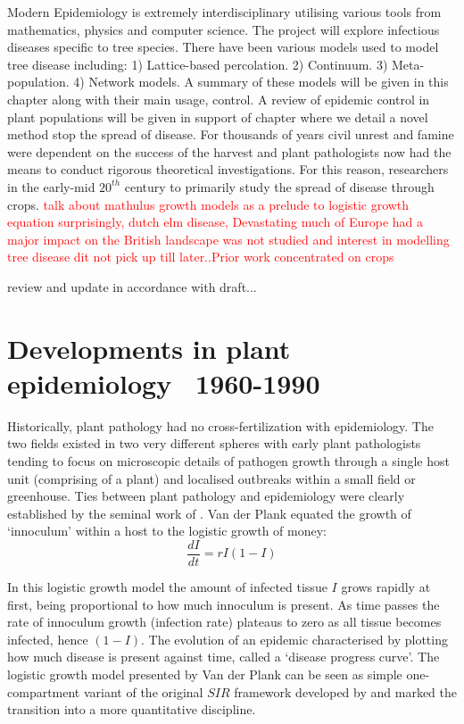 Modern Epidemiology is extremely interdisciplinary utilising various tools from mathematics, physics and computer science. The project will explore infectious diseases specific to tree species. There have been various models used to model tree disease including: 1) Lattice-based percolation. 2) Continuum. 3) Meta-population. 4) Network models. A summary of these models will be given in this chapter along with their main usage, control. A review of epidemic control in plant populations will be given in support of chapter where we detail a novel method stop the spread of disease. 
For thousands of years civil unrest and famine were dependent on the success of the harvest and plant pathologists now had the means to conduct rigorous theoretical investigations. For this reason, researchers in the early-mid $20^{th}$ century to primarily study the spread of disease through crops. 
\textcolor{red}{talk about mathulus growth models as a prelude to logistic growth equation}
\textcolor{red}{surprisingly, dutch elm disease, Devastating much of Europe had a major impact on the British landscape was not studied and interest in modelling tree disease dit not pick up till later..Prior work concentrated on crops}

\textemdash review and update in accordance with draft...

\section{Developments in plant epidemiology ~1960-1990}
Historically, plant pathology had no cross-fertilization with epidemiology. The two fields existed in two very different spheres with early plant pathologists tending to focus on microscopic details of pathogen growth through a single host unit (comprising of a plant) and localised outbreaks within a small field or greenhouse. Ties between plant pathology and epidemiology were clearly established by the seminal work of \cite{van2013plant}. Van der Plank equated the growth of `innoculum' within a host to the logistic growth of money:
\begin{equation}
    \label{van-plank}
    \frac{dI}{dt} = rI(1-I)
\end{equation}

In this logistic growth model the amount of infected tissue $I$ grows rapidly at first, being proportional to how much innoculum is present. As time passes the rate of innoculum growth (infection rate) plateaus to zero as all tissue becomes infected, hence $(1-I)$. The evolution of an epidemic characterised by plotting how much disease is present against time, called a `disease progress curve'. The logistic growth model presented by Van der Plank can be seen as simple one-compartment variant of the original $SIR$ framework developed by \cite{kermack-model} and marked the transition into a more quantitative discipline.

